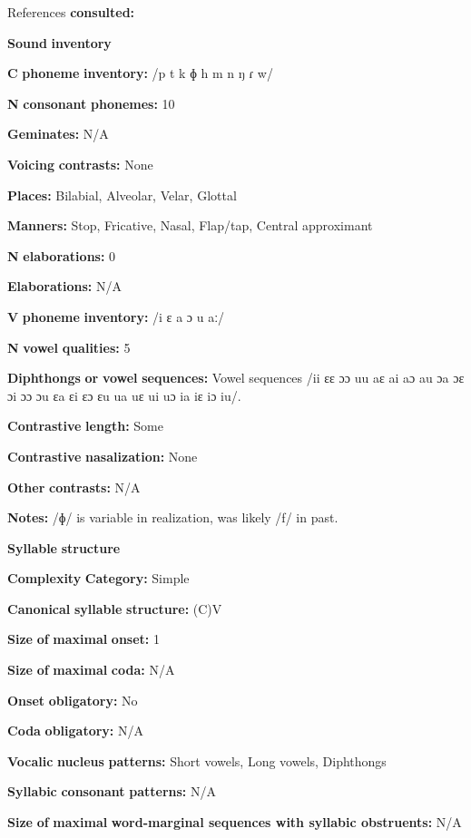 \begin{styleBody}
References \textbf{consulted:} \citet{Bauer1999}

\textbf{Sound} \textbf{inventory}

\textbf{C} \textbf{phoneme} \textbf{inventory:} /p t k ɸ h m n ŋ ɾ w/

\textbf{N} \textbf{consonant} \textbf{phonemes:} 10

\textbf{Geminates:} N/A

\textbf{Voicing} \textbf{contrasts:} None

\textbf{Places:} Bilabial, Alveolar, Velar, Glottal

\textbf{Manners:} Stop, Fricative, Nasal, Flap/tap, Central approximant

\textbf{N} \textbf{elaborations:} 0

\textbf{Elaborations:} N/A

\textbf{V} \textbf{phoneme} \textbf{inventory:} /i ɛ a ɔ u aː/

\textbf{N} \textbf{vowel} \textbf{qualities:} 5

\textbf{Diphthongs} \textbf{or} \textbf{vowel} \textbf{sequences:} Vowel sequences /ii ɛɛ ɔɔ uu aɛ ai aɔ au ɔa ɔɛ ɔi ɔɔ ɔu ɛa ɛi ɛɔ ɛu ua uɛ ui uɔ ia iɛ iɔ iu/.

\textbf{Contrastive} \textbf{length:} Some

\textbf{Contrastive} \textbf{nasalization:} None

\textbf{Other} \textbf{contrasts:} N/A

\textbf{Notes:} /ɸ/ is variable in realization, was likely /f/ in past.

\textbf{Syllable} \textbf{structure}

\textbf{Complexity} \textbf{Category:} Simple

\textbf{Canonical} \textbf{syllable} \textbf{structure:} (C)V \citep[533-8]{Bauer1999}

\textbf{Size} \textbf{of} \textbf{maximal} \textbf{onset:} 1

\textbf{Size} \textbf{of} \textbf{maximal} \textbf{coda:} N/A

\textbf{Onset} \textbf{obligatory:} No

\textbf{Coda} \textbf{obligatory:} N/A

\textbf{Vocalic} \textbf{nucleus} \textbf{patterns:} Short vowels, Long vowels, Diphthongs

\textbf{Syllabic} \textbf{consonant} \textbf{patterns:} N/A

\textbf{Size} \textbf{of} \textbf{maximal} \textbf{word{}-marginal sequences with syllabic obstruents:} N/A


\end{styleBody}
